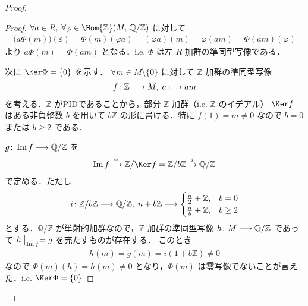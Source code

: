 \documentclass[algtopo_main]{subfiles}
\begin{document}
\begin{proof}
    \begin{proof}
        $\forall a \in R,\; \forall \varphi \in \Hom{\mathbb{Z}}(M,\, \mathbb{Q}/\mathbb{Z})$ に対して 
        \begin{align}
            \bigl( a \Phi (m) \bigr) (\varepsilon) = \Phi(m)(\varphi a) = (\varphi a)(m) = \varphi (am) = \Phi(am) (\varphi)
        \end{align}
        より $a\Phi(m) = \Phi (am)$ となる．i.e. $\Phi$ は左 $R$ 加群の準同型写像である．

        次に $\Ker\Phi = \{0\}$ を示す．  
        $\forall m \in M \setminus \{0\}$ に対して $\mathbb{Z}$ 加群の準同型写像
        \begin{align}
            f \colon \mathbb{Z} \longrightarrow M,\; a \longmapsto am
        \end{align}
        を考える．$\mathbb{Z}$ が\hyperref[def:PID]{PID}であることから，部分 $\mathbb{Z}$ 加群（i.e. $\mathbb{Z}$ のイデアル） $\Ker f$ はある非負整数 $b$ を用いて $b \mathbb{Z}$ の形に書ける．特に $f(1) = m \neq 0$ なので $b = 0$ または $b \ge 2$ である．
        
        $g \colon \Im f \longrightarrow \mathbb{Q}/\mathbb{Z}$ を
        \begin{align}
            \Im f \xrightarrow{\cong} \mathbb{Z}/\Ker f = \mathbb{Z}/ b\mathbb{Z} \xrightarrow{i} \mathbb{Q}/\mathbb{Z}
        \end{align}
        で定める．ただし
        \begin{align}
            i \colon \mathbb{Z}/ b \mathbb{Z} \longrightarrow \mathbb{Q}/\mathbb{Z},\; n + b \mathbb{Z} \longmapsto
            \begin{cases}
                \frac{n}{2} + \mathbb{Z}, & b = 0 \\
                \frac{n}{b} + \mathbb{Z}, & b \ge 2
            \end{cases}
        \end{align}
        とする．$\mathbb{Q}/\mathbb{Z}$ が\hyperref[def:inj-mod]{単射的加群}なので，$\mathbb{Z}$ 加群の準同型写像 $h \colon M \longrightarrow \mathbb{Q}/\mathbb{Z}$ であって $h \bigm|_{\Im f} = g$ を充たすものが存在する．
        このとき
        \begin{align}
            h(m) = g(m) = i(1 + b \mathbb{Z}) \neq 0
        \end{align}
        なので $\Phi(m)(h) = h(m) \neq 0$ となり，$\Phi(m)$ は零写像でないことが言えた．i.e. $\Ker \Phi = \{0\}$ 
    \end{proof}
    
    \hrulefill


\end{proof}
\end{document}
